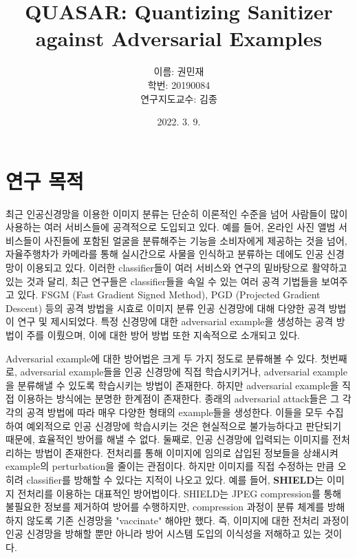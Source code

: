 \documentclass{article}
\title{QUASAR: Quantizing Sanitizer against Adversarial Examples}
\author{이름: 권민재\\학번: 20190084\\연구지도교수: 김종}
\date{2022. 3. 9.}
\begin{document}
\maketitle\thispagestyle{fancy}

\noindent\makebox[\linewidth]{\rule{\textwidth}{0.4pt}}

\section{연구 목적}

최근 인공신경망을 이용한 이미지 분류는 단순히 이론적인 수준을 넘어 사람들이 많이 사용하는 여러 서비스들에 공격적으로 도입되고 있다. 예를 들어, 온라인 사진 앨범 서비스들이 사진들에 포함된 얼굴을 분류해주는 기능을 소비자에게 제공하는 것을 넘어, 자율주행차가 카메라를 통해 실시간으로 사물을 인식하고 분류하는 데에도 인공 신경망이 이용되고 있다. 이러한 classifier들이 여러 서비스와 연구의 밑바탕으로 활약하고 있는 것과 달리, 최근 연구들은 classifier들을 속일 수 있는 여러 공격 기법들을 보여주고 있다. FSGM (Fast Gradient Signed Method), PGD (Projected Gradient Descent) 등의 공격 방법을 시효로 이미지 분류 인공 신경망에 대해 다양한 공격 방법이 연구 및 제시되었다. 특정 신경망에 대한 adversarial example을 생성하는 공격 방법이 주를 이뤘으며, 이에 대한 방어 방법 또한 지속적으로 소개되고 있다.

Adversarial example에 대한 방어법은 크게 두 가지 정도로 분류해볼 수 있다. 첫번째로, adversarial example들을 인공 신경망에 직접 학습시키거나, adversarial example을 분류해낼 수 있도록 학습시키는 방법이 존재한다. 하지만 adversarial example을 직접 이용하는 방식에는 분명한 한계점이 존재한다. 종래의 adversarial attack들은 그 각각의 공격 방법에 따라 매우 다양한 형태의 example들을 생성한다. 이들을 모두 수집하여 예외적으로 인공 신경망에 학습시키는 것은 현실적으로 불가능하다고 판단되기 때문에, 효율적인 방어를 해낼 수 없다. 둘째로, 인공 신경망에 입력되는 이미지를 전처리하는 방법이 존재한다. 전처리를 통해 이미지에 임의로 삽입된 정보들을 상쇄시켜 example의 perturbation을 줄이는 관점이다. 하지만 이미지를 직접 수정하는 만큼 오히려 classifier를 방해할 수 있다는 지적이 나오고 있다. 예를 들어, \textbf{SHIELD}는 이미지 전처리를 이용하는 대표적인 방어법이다. SHIELD는 JPEG compression를 통해 불필요한 정보를 제거하여 방어를 수행하지만, compression 과정이 분류 체계를 방해하지 않도록 기존 신경망을 "vaccinate" 해야만 했다. \cite{das2018shield} 즉, 이미지에 대한 전처리 과정이 인공 신경망을 방해할 뿐만 아니라 방어 시스템 도입의 이식성을 저해하고 있는 것이다.
\end{document}
